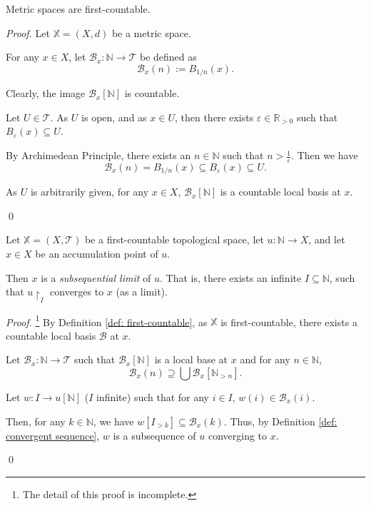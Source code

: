 \begin{proposition}
	\label{prop: metric spaces are first-countable}
	Metric spaces are first-countable.
	
	\begin{proof}
		Let $\mathbb X = (X, d)$ be a metric space.
		
		For any $x \in X$, let $\mathcal B_x: \mathbb N \to \mathcal T$ be defined as
		$$
		\mathcal B_x(n) := B_{1/n} (x).
		$$
		
		Clearly, the image $\mathcal B_x[\mathbb N]$ is countable.
		
		Let $U \in \mathcal T$. As $U$ is open, and as $x \in U$, then there exists $\varepsilon \in \mathbb R_{> 0}$ such that $B_\varepsilon(x) \subseteq U$.
		
		By Archimedean Principle, there exists an $n \in \mathbb N$ such that $n > \frac{1}{\varepsilon}$. Then we have
		$$
		\mathcal B_x(n) = B_{1/n}(x) \subseteq B_\varepsilon(x) \subseteq U.
		$$
		
		As $U$ is arbitrarily given, for any $x \in X$, $\mathcal B_x[\mathbb N]$ is a countable local basis at $x$.
		
		\qed
	\end{proof}
\end{proposition}


\begin{proposition}
	Let $\mathbb X = (X, \mathcal T)$ be a first-countable topological space, let $u: \mathbb N \to X$, and let $x \in X$ be an accumulation point of $u$.
	
	Then $x$ is a \textit{subsequential limit} of $u$. That is, there exists an infinite $I \subseteq \mathbb N$, such that $u\restriction_I$ converges to $x$ (as a limit).
	
	\begin{proof}\footnote{
			The detail of this proof is incomplete.
		}
		By Definition \ref{def: first-countable}, as $\mathbb X$ is first-countable, there exists a countable local basis $\mathcal B$ at $x$.
		
		Let $\mathcal B_x: \mathbb N \to \mathcal T$ such that $\mathcal B_x[\mathbb N]$ is a local base at $x$ and for any $n \in \mathbb N$,
		$$
		\mathcal B_x(n) \supseteq \bigcup \mathcal B_x[\mathbb N_{> n}].
		$$
		
		Let $w: I \to u[\mathbb N]$ ($I$ infinite) such that for any $i \in I$, $w(i) \in \mathcal B_x(i)$.
		
		Then, for any $k \in \mathbb N$, we have $w[I_{> k}] \subseteq \mathcal B_x(k)$. Thus, by Definition \ref{def: convergent sequence}, $w$ is a subsequence of $u$ converging to $x$.
		
		\qed
	\end{proof}
\end{proposition}


